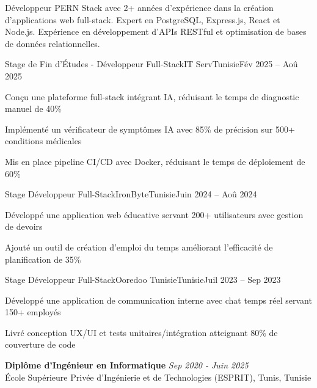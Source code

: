 \documentclass[11pt,a4paper]{article}
\begin{document}
\makecvheader
\makecontactinfo

Développeur PERN Stack avec 2+ années d'expérience dans la création d'applications web full-stack. Expert en PostgreSQL, Express.js, React et Node.js. Expérience en développement d'APIs RESTful et optimisation de bases de données relationnelles.


\begin{internship}{Stage de Fin d'Études - Développeur Full-Stack}{IT Serv}{Tunisie}{Fév 2025 -- Aoû 2025}{}
  \item Conçu une plateforme full-stack intégrant IA, réduisant le temps de diagnostic manuel de 40\%
  \item Implémenté un vérificateur de symptômes IA avec 85\% de précision sur 500+ conditions médicales
  \item Mis en place pipeline CI/CD avec Docker, réduisant le temps de déploiement de 60\%
\end{internship}

\begin{internship}{Stage Développeur Full-Stack}{IronByte}{Tunisie}{Juin 2024 -- Aoû 2024}{}
  \item Développé une application web éducative servant 200+ utilisateurs avec gestion de devoirs
  \item Ajouté un outil de création d'emploi du temps améliorant l'efficacité de planification de 35\%
\end{internship}

\begin{internship}{Stage Développeur Full-Stack}{Ooredoo Tunisie}{Tunisie}{Juil 2023 -- Sep 2023}{}
  \item Développé une application de communication interne avec chat temps réel servant 150+ employés
  \item Livré conception UX/UI et tests unitaires/intégration atteignant 80\% de couverture de code
\end{internship}

\textbf{Diplôme d'Ingénieur en Informatique} \hfill \textit{Sep 2020 - Juin 2025}\\[-2pt]
École Supérieure Privée d'Ingénierie et de Technologies (ESPRIT), Tunis, Tunisie
\end{document}
